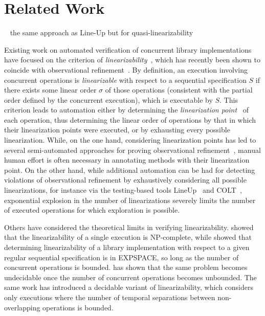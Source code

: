 \section{Related Work}
\label{sec:related}

~\cite{DBLP:conf/kbse/ZhangCW13} the same approach as Line-Up but for quasi-linearizability

Existing work on automated verification of concurrent library implementations
have focused on the criterion of
\emph{linearizability}~\citep{journals/toplas/HerlihyW90}, which has recently
been shown to coincide with observational
refinement~\citep{journals/tcs/FilipovicORY10}. By definition, an execution
involving concurrent operations is \emph{linearizable} with respect to a
sequential specification $S$ if there exists some linear order $\sigma$ of
those operations (consistent with the partial order defined by the concurrent execution), 
which is executable by $S$. This criterion leads to automation
either by determining the \emph{linearization
point}~\citep{journals/toplas/HerlihyW90} of each operation, thus determining
the linear order of operations by that in which their linearization points were
executed, or by exhausting every possible linearization. While, on the one
hand, considering linearization points has led to several semi-automated
approaches for proving observational refinement~\citep{DBLP:conf/cav/AmitRRSY07,conf/fm/LiuCLS09, conf/podc/OHearnRVYY10,
conf/cav/Vafeiadis10, conf/icse/Zhang11a, conf/pldi/LiangF13,
conf/cav/DragoiGH13}, manual human effort is often necessary in annotating
methods with their linearization point. On the other hand, while additional
automation can be had for detecting violations of observational refinement 
by exhaustively considering all possible linearizations,
for instance via the testing-based tools LineUp~\citep{conf/pldi/BurckhardtDMT10} and COLT~\citep{DBLP:conf/oopsla/ShachamBASVY11}, exponential
explosion in the number of linearizations severely limits the number of
executed operations for which exploration is possible. 

Others have considered the theoretical limits in verifying linearizability.
\citet{journals/siamcomp/GibbonsK97} showed that the linearizability of a
single execution is NP-complete, while \citet{journals/iandc/AlurMP00} showed
that determining linearizability of a library implementation with respect to a
given regular sequential specification is in EXPSPACE, so long as the number of
concurrent operations is bounded. \citet{conf/esop/BouajjaniEEH13} has shown that the same
problem becomes undecidable once the number of concurrent operations becomes
unbounded. The same work has introduced a decidable variant of linearizability, which
considers only executions where the number of temporal separations between non-overlapping 
operations is bounded.
%
